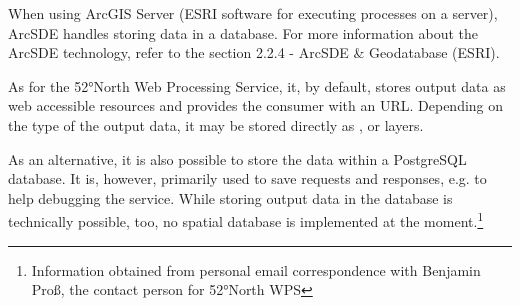 When using ArcGIS Server (ESRI software for executing processes on a
server), ArcSDE handles storing data in a database. For more
information about the ArcSDE technology, refer to the section 2.2.4 -
ArcSDE \& Geodatabase (ESRI).

As for the 52°North Web Processing Service, it, by default, stores output data as
web accessible resources and provides the consumer with an
URL. Depending on the type of the output data, it may be stored
directly as ,  or  layers. \cite{north} 

As an alternative, it is also possible to store the data within a PostgreSQL database. \cite{52north} It is, however, primarily used to save requests and responses, e.g. to help debugging the service. While storing output data in the database is technically possible, too, no spatial database is implemented at the moment.\footnote{Information obtained from personal email correspondence with Benjamin Proß, the contact person for 52°North WPS}